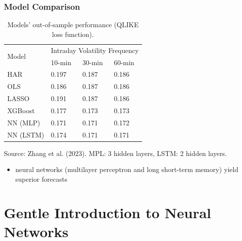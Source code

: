 \documentclass[handout]{beamer}
\begin{document}
\begin{frame}
\frametitle{Model Comparison}

\begin{table}
\begin{threeparttable}
\caption{\label{table01}Models' out-of-sample performance (QLIKE loss function).}
\begin{tabular}{|llll|}
\hline \hline 
\multirow{2}{*}{Model \hspace{23mm}} & \multicolumn{3}{c|}{Intraday  Volatility Frequency} \\ 
 & \multicolumn{1}{l}{10-min} \hspace{6mm} & \multicolumn{1}{l}{30-min} \hspace{6mm} & 60-min \\ \hline \hline  
HAR & \multicolumn{1}{l}{0.197} & \multicolumn{1}{l}{0.187} & 0.186 \\ 
OLS & \multicolumn{1}{l}{0.186} & \multicolumn{1}{l}{0.187} & 0.186\\ 
LASSO & \multicolumn{1}{l}{0.191} & \multicolumn{1}{l}{0.187} & 0.186\\
XGBoost & \multicolumn{1}{l}{0.177} & \multicolumn{1}{l}{0.173} & 0.173 \\ 
NN (MLP) & \multicolumn{1}{l}{{\color[HTML]{009901} 0.171}} & \multicolumn{1}{l}{{\color[HTML]{009901} 0.171}} &  0.172\\ 
NN (LSTM) & \multicolumn{1}{l}{0.174} & \multicolumn{1}{l}{{\color[HTML]{009901} 0.171}} &  {\color[HTML]{009901} 0.171} \\ \hline
\end{tabular}
    \begin{tablenotes}
      {\scriptsize
      \item Source: Zhang et al. (2023). MPL: 3 hidden layers, LSTM: 2 hidden layers.}
    \end{tablenotes}
\end{threeparttable}
\end{table}

\begin{itemize}
\item neural networks (multilayer perceptron and long short-term memory) yield superior forecasts


\end{itemize}
\end{frame}

\section{Gentle Introduction to Neural Networks}
\end{document}
